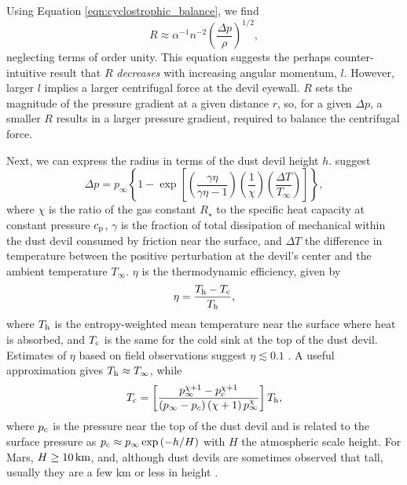 \documentclass{aastex63}
\begin{document}
Using Equation \ref{eqn:cyclostrophic_balance}, we find
\begin{equation}
    R \approx \alpha^{-1} n^{-2} \left( \dfrac{\Delta p}{\rho} \right)^{1/2},\label{eqn:R_vs_Delta-p}
\end{equation}
neglecting terms of order unity. This equation suggests the perhaps counter-intuitive result that $R$ \emph{decreases} with increasing angular momentum, $l$. However, larger $l$ implies a larger centrifugal force at the devil eyewall. $R$ sets the magnitude of the pressure gradient at a given distance $r$, so, for a given $\Delta p$, a smaller $R$ results in a larger pressure gradient, required to balance the centrifugal force.

Next, we can express the radius in terms of the dust devil height $h$. \citet{1998JAtS...55.3244R} suggest
\begin{equation}
    \Delta p = p_{\infty} \left\{ 1 - \exp \left[ \left( \dfrac{\gamma \eta}{\gamma \eta - 1}\right) \left(\dfrac{1}{\chi}\right) \left( \dfrac{\Delta T}{T_{\infty}}\right) \right] \right\}\label{eqn:Renno_Delta-p},
\end{equation}
where $\chi$ is the ratio of the gas constant $R_\star$ to the specific heat capacity at constant pressure $c_{\rm p}$, $\gamma$ is the fraction of total dissipation of mechanical within the dust devil consumed by friction near the surface, and $\Delta T$ the difference in temperature between the positive perturbation at the devil's center and the ambient temperature $T_\infty$. $\eta$ is the thermodynamic efficiency, given by 
\begin{equation}
    \eta = \dfrac{T_{\rm h} - T_{\rm c}}{T_{\rm h}}\label{eqn:Renno_eta},
\end{equation}{}
where $T_{\rm h}$ is the entropy-weighted mean temperature near the surface where heat is absorbed, and $T_{\rm c}$ is the same for the cold sink at the top of the dust devil. Estimates of $\eta$ based on field observations suggest $\eta \lesssim 0.1$ \citep[e.g.][]{2000JGR...105.1859R}. A useful approximation gives $T_{\rm h} \approx T_\infty$, while
\begin{equation}
    T_{\rm c} = \left[ \dfrac{ p_\infty^{\chi + 1} - p_{c}^{\chi + 1} }{\left( p_\infty - p_{c} \right) \left( \chi + 1\right) p_\infty^{\chi}} \right] T_{\rm h},\label{eqn:Tc}
\end{equation}
where $p_{\rm c}$ is the pressure near the top of the dust devil and is related to the surface pressure as $p_{\rm c} \approx p_\infty \exp\left(-h/H\right)$ with $H$ the atmospheric scale height. For Mars, $H \ge 10\,{\rm km}$, and, although dust devils are sometimes observed that tall, usually they are a few km or less in height \citep{2008Icar..197...39S}. 
\end{document}
